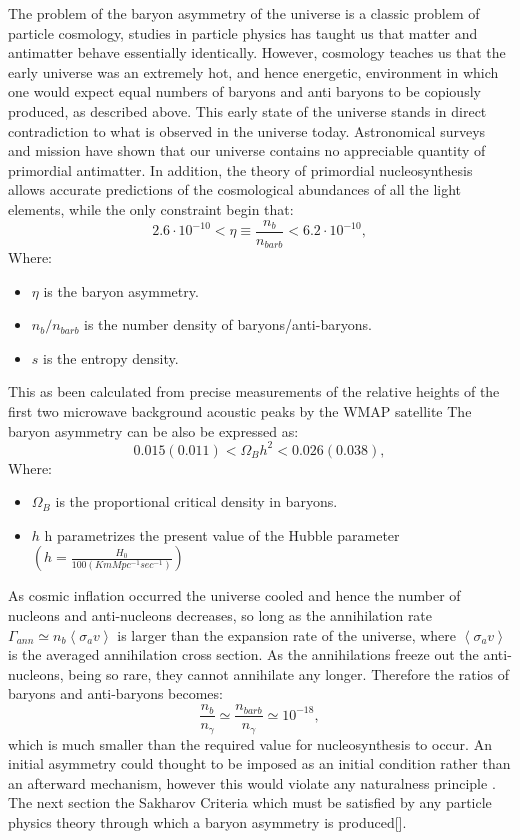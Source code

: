 The problem of the baryon asymmetry of the universe is a classic problem of particle cosmology, studies in particle physics has taught us that matter and antimatter behave essentially identically. However, cosmology teaches us that the early universe was an extremely hot, and hence energetic, environment in which one would expect equal numbers of baryons and anti baryons to be copiously produced, as described above.\cite{13} \cite{5} This early state of the universe stands in direct contradiction to what is observed in the universe today. Astronomical surveys and mission have shown that our universe contains no appreciable quantity of primordial antimatter. In addition, the theory of primordial nucleosynthesis allows accurate predictions of the cosmological abundances of all the light elements, while the only constraint begin that\cite{5}: 
\begin{equation}
2.6\cdot10^{-10} < \eta \equiv \frac{n_{b}}{n_{bar{b}}} < 6.2\cdot10^{-10},
\end{equation}
Where: 
\begin{itemize}
\item $\eta$ is the baryon asymmetry.
\item $n_{b}/ n_{bar{b}}$ is the number density of baryons/anti-baryons.
\item $s$ is the entropy density.
\end{itemize}
This as been calculated from precise measurements of the relative heights of the first two microwave background acoustic peaks by the WMAP satellite \cite{14} The baryon asymmetry can be also be expressed as:
\begin{equation}
0.015(0.011) < \Omega_{B}h^{2} < 0.026(0.038),
\end{equation}
Where: 
\begin{itemize}
\item $\Omega_{B}$ is the proportional critical density in baryons.
\item $h$ h parametrizes the present value of the Hubble parameter $(h = \frac{H_{0}}{100(KmMpc^{-1}sec^{-1})})$
\end{itemize}
As cosmic inflation occurred the universe cooled and hence the number of nucleons and anti-nucleons decreases\cite {1}, so long as the annihilation rate $\Gamma_{ann} \simeq n_{b} \left \langle {\sigma_{a}v} \right \rangle$ is larger than the expansion rate of the universe, where $\left \langle {\sigma_{a}v} \right \rangle$ is the averaged annihilation cross section. As the annihilations freeze out the anti-nucleons, being so rare, they cannot annihilate any longer. Therefore the ratios of baryons and anti-baryons becomes: \cite{1} \cite{14} \cite{11}
\begin{equation} \label{eta}
\frac{n_{b}}{n_{\gamma}} \simeq \frac{n_{bar{b}}}{n_{\gamma}} \simeq 10^{-18},
\end{equation}
which is much smaller than the required value for nucleosynthesis to occur. An initial asymmetry could thought to be imposed as an initial condition rather than an afterward mechanism, however this would violate any naturalness principle . The next section the Sakharov Criteria which must be satisfied by any particle physics theory through which a baryon asymmetry is produced[\cite{5}\cite{13}].


